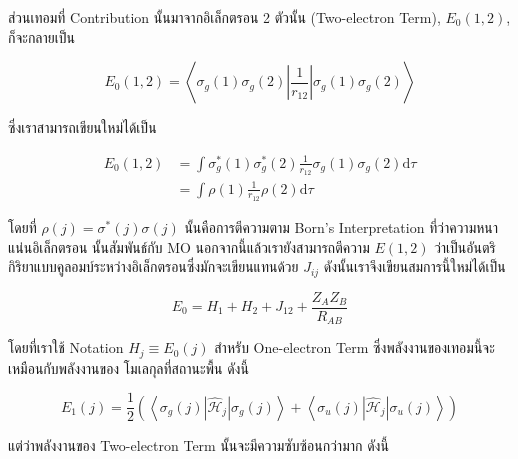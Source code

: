 ส่วนเทอมที่ Contribution นั้นมาจากอิเล็กตรอน 2 ตัวนั้น (Two-electron Term), $E_0(1,2)$, ก็จะกลายเป็น

\begin{equation}
    \label{eq:energy_one_electron_ground_state}
    E_0(1,2)
    =
    \left\langle
    \sigma_g(1) \sigma_g(2)\left|\frac{1}{r_{12}}\right| \sigma_g(1) \sigma_g(2)
    \right\rangle
\end{equation}

\noindent ซึ่งเราสามารถเขียนใหม่ได้เป็น

\begin{equation}
    \label{eq:energy_two_electron_ground_state}
    \begin{aligned}
        E_0(1,2)
         & = \int \sigma_g^*(1) \sigma_g^*(2) \frac{1}{r_{12}} \sigma_g(1) \sigma_g(2) \mathrm{d} \tau \\
         & = \int \rho(1) \frac{1}{r_{12}} \rho(2) \mathrm{d} \tau
    \end{aligned}
\end{equation}

\noindent โดยที่ $\rho(j) = \sigma^*(j) \sigma(j)$ นั้นคือการตีความตาม Born's Interpretation ที่ว่าความหนาแน่นอิเล็กตรอน%
นั้นสัมพันธ์กับ MO นอกจากนี้แล้วเรายังสามารถตีความ $E(1,2)$ ว่าเป็นอันตริกิริยาแบบคูลอมบ์ระหว่างอิเล็กตรอนซึ่งมักจะเขียนแทนด้วย $J_{i j}$
ดังนั้นเราจึงเขียนสมการนี้ใหม่ได้เป็น

\begin{equation}
    E_0
    =
    H_1 + H_2 + J_{12} + \frac{Z_A Z_B}{R_{A B}}
\end{equation}

\noindent โดยที่เราใช้ Notation $H_j \equiv E_0(j)$ สำหรับ One-electron Term ซึ่งพลังงานของเทอมนี้จะเหมือนกับพลังงานของ%
โมเลกุลที่สถานะพื้น ดังนี้

\begin{equation}
    \label{eq:energy_one_electron_triplet_state}
    E_1(j)
    =
    \frac{1}{2}
    \left(
    \left\langle
    \sigma_g(j)\left|\hat{\mathscr{H}}_j\right| \sigma_g(j)
    \right\rangle
    +
    \left\langle
    \sigma_u(j)\left|\hat{\mathscr{H}}_j\right| \sigma_u(j)
    \right\rangle
    \right)
\end{equation}

\noindent แต่ว่าพลังงานของ Two-electron Term นั้นจะมีความซับซ้อนกว่ามาก ดังนี้

